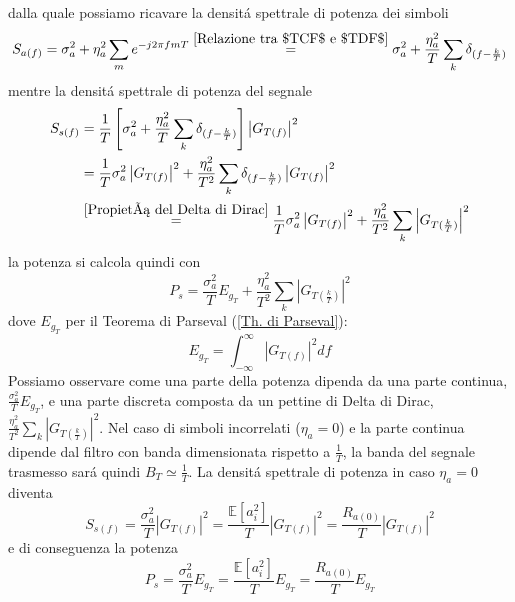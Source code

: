                 dalla quale possiamo ricavare la densitá spettrale di potenza dei simboli
                \[
                    S_{a(f)} = \sigma_a^2 + \eta_a^2\sum_{m}e^{-j2\pi fmT} \overset{\ref{Relazione tra $TCF$ e $TDF$}}{=} \sigma_a^2 + \frac{\eta_a^2 }{T}\sum_{k} \delta_{(f-\frac{k}{T})}
                \]
                mentre la densitá spettrale di potenza del segnale 
                \begin{align}
                    S_{s(f)} &= \frac{1}{T} \left[\sigma_a^2 + \frac{\eta_a^2 }{T}\sum_{k} \delta_{(f-\frac{k}{T})}\right]\left|G_{T(f)}\right|^2 \nonumber \\
                            &= \frac{1}{T} \sigma_a^2\left|G_{T(f)}\right|^2 + \frac{\eta_a^2 }{T^2}\sum_{k} \delta_{(f-\frac{k}{T})}\left|G_{T(f)}\right|^2\nonumber \\
                            &\overset{\ref{Propietá del Delta di Dirac}}{=} \frac{1}{T} \sigma_a^2\left|G_{T(f)}\right|^2 + \frac{\eta_a^2 }{T^2}\sum_{k} \left|G_{T(\frac{k}{T})}\right|^2\nonumber
                \end{align}
                la potenza si calcola quindi con 
                \[
                    P_s  = \frac{\sigma_a^2}{T} E_{g_T} + \frac{\eta_a^2 }{T^2}\sum_{k} \left|G_{T(\frac{k}{T})}\right|^2
                \]
                dove $E_{g_T}$ per il Teorema di Parseval (\ref{Th. di Parseval}):
                \[
                    E_{g_T} = \int_{-\infty}^{\infty} \left|G_{T(f)}\right|^2 df 
                \]
                Possiamo osservare come una parte della potenza dipenda da una parte continua, $\frac{\sigma_a^2}{T} E_{g_T}$, e una parte discreta
                composta da un pettine di Delta di Dirac, $\frac{\eta_a^2 }{T^2}\sum_{k} \left|G_{T(\frac{k}{T})}\right|^2$. Nel caso di simboli incorrelati ($\eta_a = 0$)
                e la parte continua dipende dal filtro con banda dimensionata rispetto a $\frac{1}{T}$, la banda del segnale trasmesso sará quindi $B_T \simeq \frac{1}{T}$. 
                La densitá spettrale di potenza in caso $\eta_a = 0$ diventa
                \[
                    S_{s(f)} = \frac{\sigma_a^2}{T} \left|G_{T(f)}\right|^2 =  \frac{\mathbb{E}[a_i^2]}{T} \left|G_{T(f)}\right|^2 = \frac{R_{a(0)}}{T} \left|G_{T(f)}\right|^2
                \] \label{Potenza - PAM}
                e di conseguenza la potenza 
                \[
                    P_s  = \frac{\sigma_a^2}{T} E_{g_T} = \frac{\mathbb{E}[a_i^2]}{T} E_{g_T} = \frac{R_{a(0)}}{T} E_{g_T}
                \]
